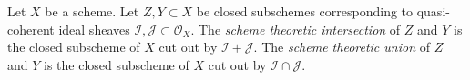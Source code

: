 \begin{definition}
\label{definition-scheme-theoretic-intersection-union}
Let $X$ be a scheme. Let $Z, Y \subset X$ be closed subschemes
corresponding to quasi-coherent ideal sheaves
$\mathcal{I}, \mathcal{J} \subset \mathcal{O}_X$.
The {\it scheme theoretic intersection} of $Z$ and $Y$
is the closed subscheme of $X$ cut out by $\mathcal{I} + \mathcal{J}$.
The {\it scheme theoretic union} of $Z$ and $Y$
is the closed subscheme of $X$ cut out by
$\mathcal{I} \cap \mathcal{J}$.
\end{definition}